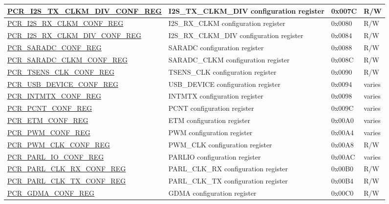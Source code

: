 \begin{longtable}{ | p{7cm} | p{6.2cm} | p{1.3cm} | p{1.5cm} | }
\hyperref[regdesc:PCRI2STXCLKMDIVCONFREG]{PCR\_I2S\_TX\_CLKM\_DIV\_CONF\_REG} & I2S\_TX\_CLKM\_DIV configuration register & 0x007C & R/W \\ \hline
\hyperref[regdesc:PCRI2SRXCLKMCONFREG]{PCR\_I2S\_RX\_CLKM\_CONF\_REG} & I2S\_RX\_CLKM configuration register & 0x0080 & R/W \\ \hline
\hyperref[regdesc:PCRI2SRXCLKMDIVCONFREG]{PCR\_I2S\_RX\_CLKM\_DIV\_CONF\_REG} & I2S\_RX\_CLKM\_DIV configuration register & 0x0084 & R/W \\ \hline
\hyperref[regdesc:PCRSARADCCONFREG]{PCR\_SARADC\_CONF\_REG} & SARADC configuration register & 0x0088 & R/W \\ \hline
\hyperref[regdesc:PCRSARADCCLKMCONFREG]{PCR\_SARADC\_CLKM\_CONF\_REG} & SARADC\_CLKM configuration register & 0x008C & R/W \\ \hline
\hyperref[regdesc:PCRTSENSCLKCONFREG]{PCR\_TSENS\_CLK\_CONF\_REG} & TSENS\_CLK configuration register & 0x0090 & R/W \\ \hline
\hyperref[regdesc:PCRUSBDEVICECONFREG]{PCR\_USB\_DEVICE\_CONF\_REG} & USB\_DEVICE configuration register & 0x0094 & varies \\ \hline
\hyperref[regdesc:PCRINTMTXCONFREG]{PCR\_INTMTX\_CONF\_REG} & INTMTX configuration register & 0x0098 & varies \\ \hline
\hyperref[regdesc:PCRPCNTCONFREG]{PCR\_PCNT\_CONF\_REG} & PCNT configuration register & 0x009C & varies \\ \hline
\hyperref[regdesc:PCRETMCONFREG]{PCR\_ETM\_CONF\_REG} & ETM configuration register & 0x00A0 & varies \\ \hline
\hyperref[regdesc:PCRPWMCONFREG]{PCR\_PWM\_CONF\_REG} & PWM configuration register & 0x00A4 & varies \\ \hline
\hyperref[regdesc:PCRPWMCLKCONFREG]{PCR\_PWM\_CLK\_CONF\_REG} & PWM\_CLK configuration register & 0x00A8 & R/W \\ \hline
\hyperref[regdesc:PCRPARLIOCONFREG]{PCR\_PARL\_IO\_CONF\_REG} & PARLIO configuration register & 0x00AC & varies \\ \hline
\hyperref[regdesc:PCRPARLCLKRXCONFREG]{PCR\_PARL\_CLK\_RX\_CONF\_REG} & PARL\_CLK\_RX configuration register & 0x00B0 & R/W \\ \hline
\hyperref[regdesc:PCRPARLCLKTXCONFREG]{PCR\_PARL\_CLK\_TX\_CONF\_REG} & PARL\_CLK\_TX configuration register & 0x00B4 & R/W \\ \hline
\hyperref[regdesc:PCRGDMACONFREG]{PCR\_GDMA\_CONF\_REG} & GDMA configuration register & 0x00C0 & R/W \\ \hline

\end{longtable}
